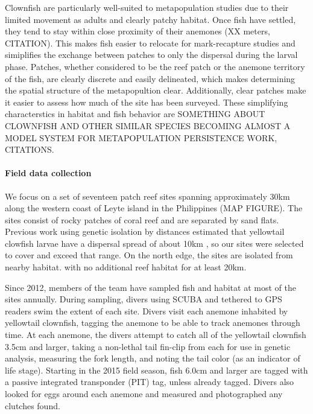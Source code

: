 \documentclass[12pt, oneside]{article}   	%
\begin{document}

Clownfish are particularly well-suited to metapopulation studies due to their limited movement as adults and clearly patchy habitat. Once fish have settled, they tend to stay within close proximity of their anemones (XX meters, CITATION). This makes fish easier to relocate for mark-recapture studies and simiplifies the exchange between patches to only the dispersal during the larval phase. Patches, whether considered to be the reef patch or the anemone territory of the fish, are clearly discrete and easily delineated, which makes determining the spatial structure of the metapopultion clear. Additionally, clear patches make it easier to assess how much of the site has been surveyed. These simplifying characterstics in habitat and fish behavior are SOMETHING ABOUT CLOWNFISH AND OTHER SIMILAR SPECIES BECOMING ALMOST A MODEL SYSTEM FOR METAPOPULATION PERSISTENCE WORK, CITATIONS.

\paragraph*{Field data collection}

We focus on a set of seventeen patch reef sites spanning approximately 30km along the western coast of Leyte island in the Philippines (MAP FIGURE). The sites consist of rocky patches of coral reef and are separated by sand flats. Previous work using genetic isolation by distances estimated that yellowtail clowfish larvae have a dispersal spread of about 10km \citep{pinsky2010using}, so our sites were selected to cover and exceed that range. On the north edge, the sites are isolated from nearby habitat. with no additional reef habitat for at least 20km. %

Since 2012, members of the team have sampled fish and habitat at most of the sites annually. During sampling, divers using SCUBA and tethered to GPS readers swim the extent of each site. Divers visit each anemone inhabited by yellowtail clownfish, tagging the anemone to be able to track anemones through time. At each anemone, the divers attempt to catch all of the yellowtail clownfish 3.5cm and larger, taking a non-lethal tail fin-clip from each for use in genetic analysis, measuring the fork length, and noting the tail color (as an indicator of life stage). Starting in the 2015 field season, fish 6.0cm and larger are tagged with a passive integrated transponder (PIT) tag, unless already tagged. Divers also looked for eggs around each anemone and measured and photographed any clutches found.
\end{document}
